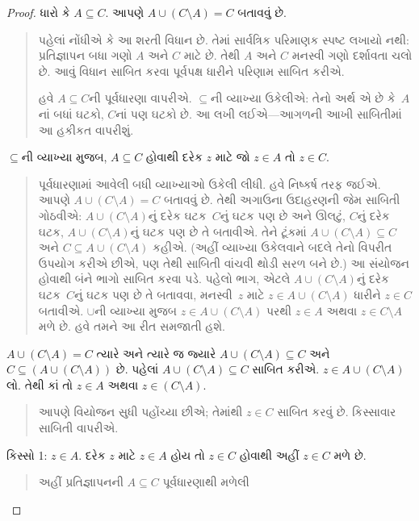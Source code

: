 \begin{proof}
  ધારો કે $A \subseteq C$. આપણે $A \cup (C
  \setminus A) = C$ બતાવવું છે.
  \begin{quote}
    પહેલાં નોંધીએ કે આ શરતી વિધાન છે. તેમાં સાર્વત્રિક પરિમાણક
    સ્પષ્ટ લખાયો નથી: પ્રતિજ્ઞાપન બધા ગણો $A$ અને $C$ માટે
    છે. તેથી $A$ અને $C$ મનસ્વી ગણો દર્શાવતા ચલો છે. આવું
    વિધાન સાબિત કરવા પૂર્વપક્ષ ધારીને પરિણામ સાબિત કરીએ.

    હવે $A \subseteq C$ની પૂર્વધારણા વાપરીએ. $\subseteq$ની
    વ્યાખ્યા ઉકેલીએ: તેનો અર્થ એ છે કે~$A$નાં બધાં
    ઘટકો, $C$નાં પણ ઘટકો છે. આ લખી
    લઈએ---આગળની આખી સાબિતીમાં આ હકીકત વાપરીશું.
  \end{quote}
  $\subseteq$ની વ્યાખ્યા મુજબ, $A \subseteq C$ હોવાથી દરેક
  $z$ માટે જો $z \in A$ તો $z \in C$.
  \begin{quote}
    પૂર્વધારણામાં આવેલી બધી વ્યાખ્યાઓ ઉકેલી લીધી. હવે
    નિષ્કર્ષ તરફ જઈએ. આપણે $A \cup (C \setminus A) = C$
    બતાવવું છે. તેથી અગાઉના ઉદાહરણની જેમ સાબિતી ગોઠવીએ:
    $A \cup (C \setminus A)$નું દરેક ઘટક~$C$નું
    ઘટક પણ છે અને ઊલટું, $C$નું દરેક ઘટક,
    $A \cup (C
    \setminus A)$નું ઘટક પણ છે તે બતાવીએ. તેને
    ટૂંકમાં $A \cup (C \setminus A)
    \subseteq C$ અને $C \subseteq A \cup (C \setminus A)$
    કહીએ. (અહીં વ્યાખ્યા ઉકેલવાને બદલે તેનો વિપરીત ઉપયોગ
    કરીએ છીએ, પણ તેથી સાબિતી વાંચવી થોડી સરળ બને છે.)
    આ સંયોજન હોવાથી બંને ભાગો સાબિત કરવા પડે. પહેલો ભાગ,
    એટલે $A \cup (C \setminus A)$નું દરેક ઘટક~$C$નું
    ઘટક પણ છે તે બતાવવા, મનસ્વી~$z$ માટે
    $z \in A \cup (C \setminus A)$ ધારીને $z \in C$
    બતાવીએ. $\cup$ની વ્યાખ્યા મુજબ $z \in A \cup (C \setminus A)$
    પરથી $z \in A$ અથવા $z \in C \setminus A$ મળે છે.
    હવે તમને આ રીત સમજાતી હશે.
    \end{quote}
  $A \cup (C \setminus A) = C$ ત્યારે અને ત્યારે જ જ્યારે
  $A \cup (C \setminus A) \subseteq
  C$ અને $C \subseteq (A \cup (C \setminus A))$ છે. પહેલાં $A \cup (C \setminus A) \subseteq C$
  સાબિત કરીએ. $z \in A \cup (C
  \setminus A)$ લો. તેથી કાં તો $z \in A$ અથવા $z \in (C \setminus A)$.
  \begin{quote}
    આપણે વિયોજન સુધી પહોંચ્યા છીએ; તેમાંથી $z \in C$
    સાબિત કરવું છે. કિસ્સાવાર સાબિતી વાપરીએ.
  \end{quote}
  કિસ્સો 1: $z \in A$. દરેક $z$ માટે $z \in A$ હોય તો
  $z \in C$ હોવાથી અહીં $z \in C$ મળે છે.
  \begin{quote}
    અહીં પ્રતિજ્ઞાપનની $A \subseteq C$ પૂર્વધારણાથી મળેલી

\end{quote}
\end{proof}
